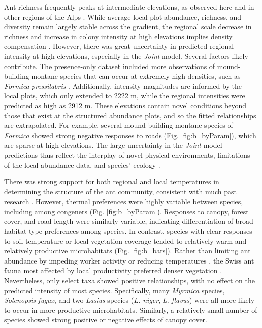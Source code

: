 \documentclass[preprint,final,times,12pt,3p]{elsarticle}
\begin{document}
Ant richness frequently peaks at intermediate elevations, as observed here and in other regions of the Alps \citep{Hellrigl2003,Glaser2006,SzewczykMcCain2016}. While average local plot abundance, richness, and diversity remain largely stable across the gradient, the regional scale decrease in richness and increase in colony intensity at high elevations implies density compensation \citep{LongColw2011}. However, there was great uncertainty in predicted regional intensity at high elevations, especially in the \emph{Joint} model. Several factors likely contribute. The presence-only dataset included more observations of mound-building montane species that can occur at extremely high densities, such as \emph{Formica pressilabris} \citep{Seifert2018}. Additionally, intensity magnitudes are informed by the local plots, which only extended to 2222 m, while the regional intensities were predicted as high as 2912 m. These elevations contain novel conditions beyond those that exist at the structured abundance plots, and so the fitted relationships are extrapolated. For example, several mound-building montane species of \emph{Formica} showed strong negative responses to roads (Fig. \ref{fig:b_byParam}), which are sparse at high elevations. The large uncertainty in the \emph{Joint} model predictions thus reflect the interplay of novel physical environments, limitations of the local abundance data, and species' ecology \citep{Harris2018,Guillera-Arroita2019}. 

There was strong support for both regional and local temperatures in determining the structure of the ant community, consistent with much past research \citep{SandersEtAl2007,Penick2017,Bishop2016,SzewczykMcCain2016,Szewczyk2018}. However, thermal preferences were highly variable between species, including among congeners (Fig. \ref{fig:b_byParam}). Responses to canopy, forest cover, and road length were similarly variable, indicating differentiation of broad habitat type preferences among species. In contrast, species with clear responses to soil temperature or local vegetation coverage tended to relatively warm and relatively productive microhabitats (Fig. \ref{fig:b_bars}). Rather than limiting ant abundance by impeding worker activity or reducing temperatures \citep{LassauHochuli2004,Queiroz2016}, the Swiss ant fauna most affected by local productivity preferred denser vegetation \citep{Andersen1986,KaspariEtAl2000}. Nevertheless, only select taxa showed positive relationships, with no effect on the predicted intensity of most species. Specifically, many \emph{Myrmica} species, \emph{Solenopsis fugax}, and two \emph{Lasius} species (\emph{L. niger}, \emph{L. flavus}) were all more likely to occur in more productive microhabitats. Similarly, a relatively small number of species showed strong positive or negative effects of canopy cover. 
\end{document}
